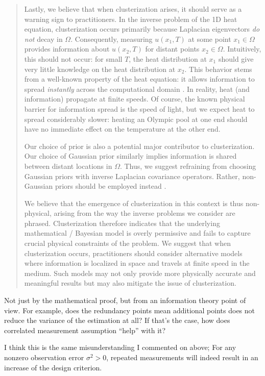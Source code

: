 \begin{quote}
  Lastly, we believe that when clusterization arises, it should serve
  as a warning sign to practitioners. In the inverse problem of the 1D
  heat equation, clusterization occurs primarily because Laplacian
  eigenvectors \emph{do not} decay in $\Omega$. Consequently,
  measuring $u(x_1, T)$ at some point $x_1 \in \Omega$ provides
  information about $u(x_2,T)$ for distant points $x_2 \in
  \Omega$. Intuitively, this should not occur: for small $T$, the heat
  distribution at $x_1$ should give very little knowledge on the heat
  distribution at $x_2$. This behavior stems from a well-known
  property of the heat equation: it allows information to spread
  \emph{instantly} across the computational domain
  \cite{renardy2006PDE}. In reality, heat (and information) propagate
  at finite speeds. Of course, the known physical barrier for
  information spread is the speed of light, but we expect heat to
  spread considerably slower: heating an Olympic pool at one end
  should have no immediate effect on the temperature at the other end.

  Our choice of prior is also a potential major contributor to
  clusterization. Our choice of Gaussian prior similarly implies
  information is shared between distant locations in $\Omega$. Thus, we
  suggest refraining from choosing Gaussian priors with inverse
  Laplacian covariance operators. Rather, non-Gaussian priors should be
  employed instead \cite{hosseini2017, hosseini2019}.
  
  We believe that the emergence of clusterization in this context is
  thus non-physical, arising from the way the inverse problems we
  consider are phrased. Clusterization therefore indicates that the
  underlying mathematical / Bayesian model is overly permissive and
  fails to capture crucial physical constraints of the problem. We
  suggest that when clusterization occurs, practitioners should consider
  alternative models where information is localized in space and travels
  at finite speed in the medium. Such models may not only provide more
  physically accurate and meaningful results but may also mitigate the
  issue of clusterization.
\end{quote}


\RC Not just by the mathematical proof, but from an information theory
point of view. For example, does the redundancy points mean additional
points does not reduce the variance of the estimation at all? If
that’s the case, how does correlated measurement assumption “help”
with it?

\AR I think this is the same misunderstanding I commented on above;
For any nonzero observation error $\sigma^2 > 0$, repeated
measurements will indeed result in an increase of the design
criterion.


